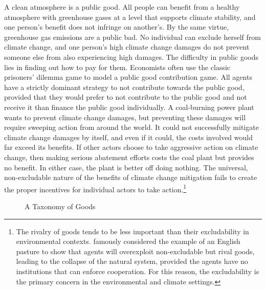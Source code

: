 A clean atmosphere is a public good. All people can benefit from a healthy atmosphere with greenhouse gases at a level that supports climate stability, and one person's benefit does not infringe on another's. By the same virtue, greenhouse gas emissions are a public bad. No individual can exclude herself from climate change, and one person's high climate change damages do not prevent someone else from also experiencing high damages. The difficulty in public goods lies in finding out how to pay for them. Economists often use the classic prisoners' dilemma game to model a public good contribution game. All agents have a strictly dominant strategy to not contribute towards the public good, provided that they would prefer to not contribute to the public good and not receive it than finance the public good individually. A coal-burning power plant wants to prevent climate change damages, but preventing these damages will require sweeping action from around the world. It could not successfully mitigate climate change damages by itself, and even if it could, the costs involved would far exceed its benefits. If other actors choose to take aggressive action on climate change, then making serious abatement efforts costs the coal plant but provides no benefit. In either case, the plant is better off doing nothing. The universal, non-excludable nature of the benefits of climate change mitigation fails to create the proper incentives for individual actors to take action.\footnote{The rivalry of goods tends to be less important than their excludability in environmental contexts. \cite{hardin1968tragedy} famously considered the example of an English pasture to show that agents will overexploit non-excludable but rival goods, leading to the collapse of the natural system, provided the agents have no institutions that can enforce cooperation. For this reason, the excludability is the primary concern in the environmental and climate settings.}

\begin{figure}
\caption{A Taxonomy of Goods}
\label{goods}
\centering
{}
\end{figure}

